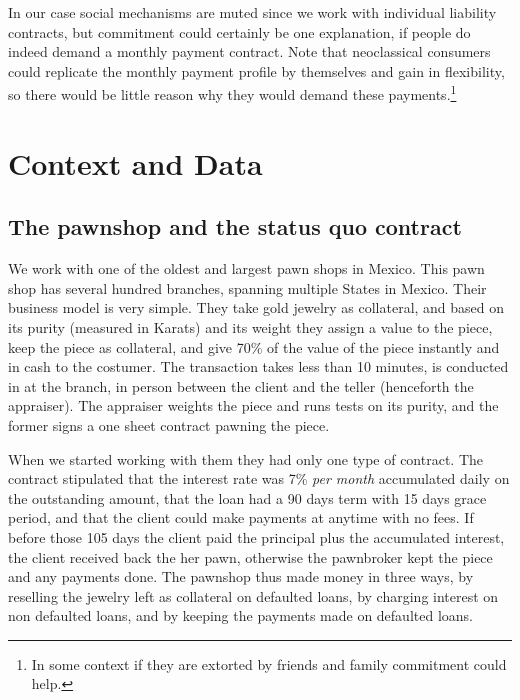 \documentclass[11pt]{article}
\begin{document}
In our case social mechanisms are muted since we work with individual liability contracts, but commitment could certainly be one explanation, if people do indeed demand a monthly payment contract. Note that neoclassical consumers could replicate the monthly payment profile by themselves and gain in flexibility, so there would be little reason why they would demand these payments.\footnote{In some context if they are extorted by friends and family commitment could help.}





\section{Context and Data} \label{context}

    \subsection{The pawnshop and the status quo contract}
    
    We work with one of the oldest and largest pawn shops in Mexico. This pawn shop has several hundred branches, spanning multiple States in Mexico. Their business model is very simple. They take gold jewelry as collateral, and based on its purity (measured in Karats) and its weight they assign a value to the piece, keep the piece as collateral, and give 70\% of the value of the piece instantly and in cash to the costumer. The transaction takes less than 10 minutes, is conducted in at the branch, in person between the client and the teller (henceforth the appraiser). The appraiser weights the piece and runs tests on its purity, and the former signs a one sheet contract pawning the piece.
    
    When we started working with them they had only one type of contract. The contract stipulated that the interest rate was 7\% \textit{per month} accumulated daily on the outstanding amount, that the loan had a 90 days term with 15 days grace period, and that the client could make payments at anytime with no fees. If before those 105 days the client paid the principal plus the accumulated interest, the client received back the her pawn, otherwise the pawnbroker kept the piece and any payments done. The pawnshop thus made money in three ways, by reselling the jewelry left as collateral on defaulted loans, by charging interest on non defaulted loans, and by keeping the payments made on defaulted loans. 
    
\end{document}

